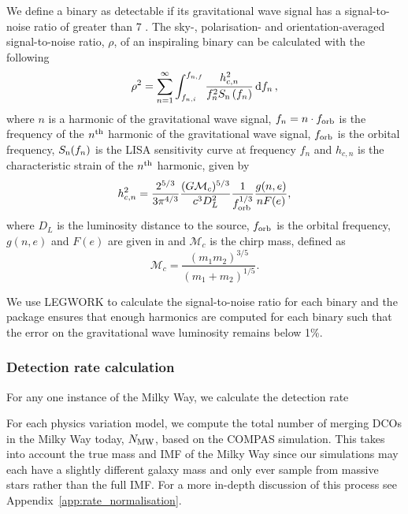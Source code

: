 We define a binary as detectable if its gravitational wave signal has a signal-to-noise ratio of greater than 7 \citep[e.g.][]{Breivik+2020, Korol+2020}. The sky-, polarisation- and orientation-averaged signal-to-noise ratio, $\rho$, of an inspiraling binary can be calculated with the following \citep[e.g.][]{Finn+2000}
\begin{equation}\label{eq:snr}
    \rho^2 = \sum_{n=1}^{\infty} \int_{f_{n, i}}^{f_{n, f}} \frac{h_{c, n}^{2}}{f_{n}^{2} S_{\rm n}\left(f_{n}\right)} \dd{f_n},
\end{equation}
where $n$ is a harmonic of the gravitational wave signal, $f_n = n \cdot f_{\rm orb}$ is the frequency of the $n^{\rm th}$ harmonic of the gravitational wave signal, $f_{\rm orb}$ is the orbital frequency, $S_{\rm n}(f_n)$ is the LISA sensitivity curve at frequency $f_n$ \citep[e.g.][]{Robson+2019} and $h_{c,n}$ is the characteristic strain of the $n^{\rm th}$ harmonic, given by \citep[e.g.][]{Barack+2004}
\begin{equation}\label{eq:charstrain}
    h^2_{c,n} = \frac{2^{5/3}}{3 \pi^{4/3}} \frac{(G \mathcal{M}_c)^{5/3}}{c^3 D_L^2} \frac{1}{f_{\rm orb}^{1/3}} \frac{g(n,e)}{n F(e)},
\end{equation}
where $D_L$ is the luminosity distance to the source, $f_{\rm orb}$ is the orbital frequency, $g(n, e)$ and $F(e)$ are given in \citet{Peters+1963} and $\mathcal{M}_c$ is the chirp mass, defined as
\begin{equation}\label{eq:chirp_mass}
    \mathcal{M}_c = \frac{(m_1 m_2)^{3/5}}{(m_1 + m_2)^{1/5}}.
\end{equation}

We use LEGWORK to calculate the signal-to-noise ratio for each binary and the package ensures that enough harmonics are computed for each binary such that the error on the gravitational wave luminosity remains below 1\%.

\subsubsection{Detection rate calculation}
For any one instance of the Milky Way, we calculate the detection rate 

For each physics variation model, we compute the total number of merging DCOs in the Milky Way today, $N_{\rm MW}$, based on the COMPAS simulation. This takes into account the true mass and IMF of the Milky Way since our simulations may each have a slightly different galaxy mass and only ever sample from massive stars rather than the full IMF. For a more in-depth discussion of this process see Appendix~\ref{app:rate_normalisation}.

